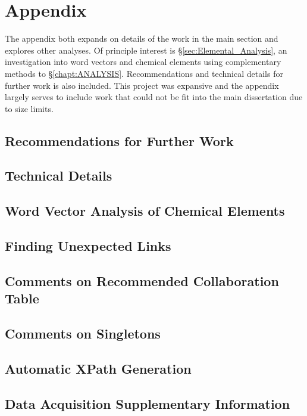\chapter{Appendix}
\label{chapt:appendix}
The appendix both expands on details of the work in the main section and explores other analyses. Of principle interest is \S\ref{sec:Elemental_Analysis}, an investigation into word vectors and chemical elements using complementary methods to \S\ref{chapt:ANALYSIS}. Recommendations and technical details for further work is also included. This project was expansive and the appendix largely serves to include work that could not be fit into the main dissertation due to size limits.
\section{Recommendations for Further Work}

\newpage
\section{Technical Details}

\newpage
\section{Word Vector Analysis of Chemical Elements}

\newpage
\section{Finding Unexpected Links}

\newpage
\section{Comments on Recommended Collaboration Table}

\newpage
\section{Comments on Singletons}

\newpage
\section{Automatic XPath Generation}

\newpage
\section{Data Acquisition Supplementary Information}
